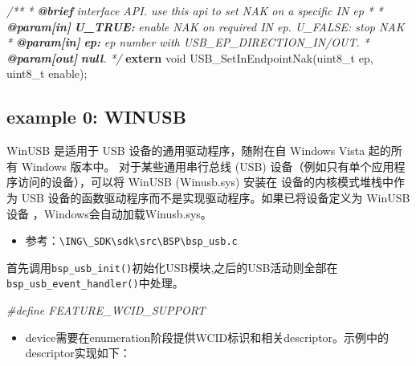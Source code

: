 \documentclass[
  12pt,
]{book}
\newenvironment{Shaded}{\begin{snugshade}}{\end{snugshade}}
\newcommand{\AnnotationTok}[1]{\textcolor[rgb]{0.56,0.35,0.01}{\textbf{\textit{#1}}}}
\newcommand{\CommentTok}[1]{\textcolor[rgb]{0.56,0.35,0.01}{\textit{#1}}}
\newcommand{\CommentVarTok}[1]{\textcolor[rgb]{0.56,0.35,0.01}{\textbf{\textit{#1}}}}
\newcommand{\DataTypeTok}[1]{\textcolor[rgb]{0.13,0.29,0.53}{#1}}
\newcommand{\KeywordTok}[1]{\textcolor[rgb]{0.13,0.29,0.53}{\textbf{#1}}}
\newcommand{\NormalTok}[1]{#1}
\newcommand{\PreprocessorTok}[1]{\textcolor[rgb]{0.56,0.35,0.01}{\textit{#1}}}
\providecommand{\tightlist}{%
  \setlength{\itemsep}{0pt}\setlength{\parskip}{0pt}}
\begin{document}
\begin{Shaded}
\begin{Highlighting}[]
\CommentTok{/**}
\CommentTok{ * }\AnnotationTok{@brief}\CommentTok{ interface API. use this api to set NAK on a specific IN ep}
\CommentTok{ *}
\CommentTok{ * }\AnnotationTok{@param[in]}\CommentTok{ }\CommentVarTok{U_TRUE:}\CommentTok{ enable NAK on required IN ep. U_FALSE: stop NAK}
\CommentTok{ * }\AnnotationTok{@param[in]}\CommentTok{ }\CommentVarTok{ep:}\CommentTok{ ep number with USB_EP_DIRECTION_IN/OUT. }
\CommentTok{ * }\AnnotationTok{@param[out]}\CommentTok{ }\CommentVarTok{null}\CommentTok{. }
\CommentTok{ */}
\KeywordTok{extern} \DataTypeTok{void}\NormalTok{ USB_SetInEndpointNak(}\DataTypeTok{uint8_t}\NormalTok{ ep, }\DataTypeTok{uint8_t}\NormalTok{ enable);}
\end{Highlighting}
\end{Shaded}

\hypertarget{example-0-winusb}{%
\subsection{example 0: WINUSB}\label{example-0-winusb}}

WinUSB 是适用于 USB 设备的通用驱动程序，随附在自 Windows Vista 起的所有 Windows 版本中。 对于某些通用串行总线 (USB) 设备（例如只有单个应用程序访问的设备），可以将 WinUSB (Winusb.sys) 安装在 设备的内核模式堆栈中作为 USB 设备的函数驱动程序而不是实现驱动程序。如果已将设备定义为 WinUSB 设备 ，Windows会自动加载Winusb.sys。

\begin{itemize}
\tightlist
\item
  参考：\texttt{\textbackslash{}ING\textbackslash{}\_SDK\textbackslash{}sdk\textbackslash{}src\textbackslash{}BSP\textbackslash{}bsp\_usb.c}
\end{itemize}

首先调用\texttt{bsp\_usb\_init()}初始化USB模块,之后的USB活动则全部在\texttt{bsp\_usb\_event\_handler()}中处理。

\begin{Shaded}
\begin{Highlighting}[]
\PreprocessorTok{#define FEATURE_WCID_SUPPORT}
\end{Highlighting}
\end{Shaded}

\begin{itemize}
\tightlist
\item
  device需要在enumeration阶段提供WCID标识和相关descriptor。示例中的descriptor实现如下：
\end{itemize}
\end{document}
